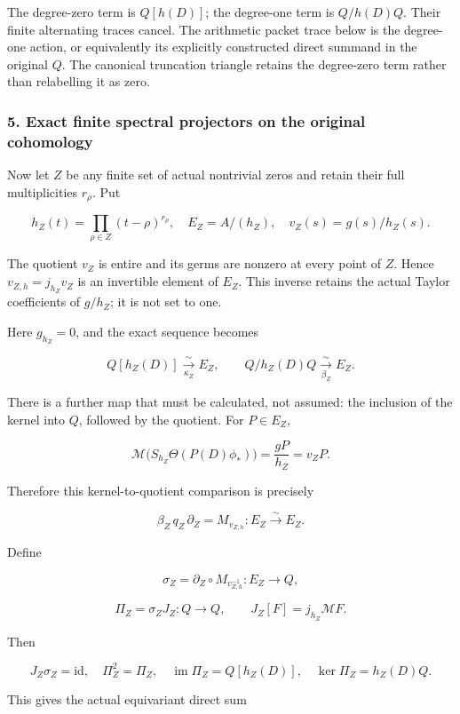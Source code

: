 The degree-zero term is \(Q[h(D)]\); the degree-one term is \(Q/h(D)Q\). Their finite alternating
traces cancel. The arithmetic packet trace below is the degree-one action, or equivalently its
explicitly constructed direct summand in the original \(Q\). The canonical truncation triangle
retains the degree-zero term rather than relabelling it as zero.

\subsubsection{5. Exact finite spectral projectors on the original
cohomology}\label{pr_8:exact-finite-spectral-projectors-on-the-original-cohomology}

Now let \(Z\) be any finite set of actual nontrivial zeros and retain their full multiplicities
\(r_\rho\). Put

\[h_Z(t)=\prod_{\rho\in Z}(t-\rho)^{r_\rho},\quad E_Z=A/(h_Z),\quad
v_Z(s)=g(s)/h_Z(s).\]

The quotient \(v_Z\) is entire and its germs are nonzero at every point of \(Z\). Hence
\(v_{Z,h}=j_{h_Z}v_Z\) is an invertible element of \(E_Z\). This inverse retains the actual Taylor
coefficients of \(g/h_Z\); it is not set to one.

Here \(g_{h_Z}=0\), and the exact sequence becomes

\[Q[h_Z(D)]\xrightarrow[\kappa_Z]{\sim}E_Z,
\qquad Q/h_Z(D)Q\xrightarrow[\beta_Z]{\sim}E_Z.\]

There is a further map that must be calculated, not assumed: the inclusion of the kernel into \(Q\),
followed by the quotient. For \(P\in E_Z\),

\[\mathcal M\bigl(S_{h_Z}\Theta(P(D)\phi_*)\bigr)
=\frac{gP}{h_Z}=v_ZP.\]

Therefore this kernel-to-quotient comparison is precisely

\[\boxed{\beta_Z\,q_Z\,\partial_Z=M_{v_{Z,h}}:E_Z\xrightarrow{\sim}E_Z.}\]

Define

\[\sigma_Z=\partial_Z\circ M_{v_{Z,h}^{-1}}:E_Z\longrightarrow Q,\]

\[\boxed{\Pi_Z=\sigma_ZJ_Z:Q\longrightarrow Q,\qquad J_Z[F]=j_{h_Z}\mathcal MF.}\]

Then

\[\boxed{J_Z\sigma_Z=\mathrm{id},\quad \Pi_Z^2=\Pi_Z,\quad
\operatorname{im}\Pi_Z=Q[h_Z(D)],\quad \ker\Pi_Z=h_Z(D)Q.}\]

This gives the actual equivariant direct sum

